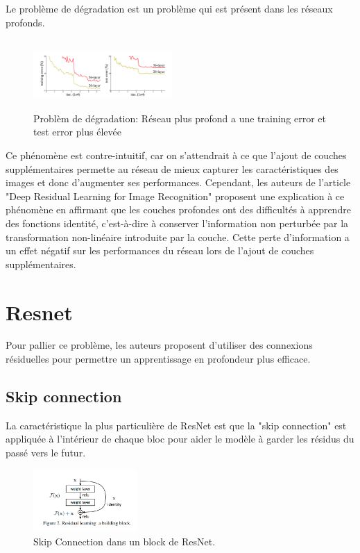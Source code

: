 \documentclass{article}
\begin{document}
Le problème de dégradation est un problème qui est présent dans les réseaux profonds.
\begin{figure}[t]
    \centering
    \includegraphics[width=200,height=100]{./img/degradation}
    \caption{Problèm de dégradation: Réseau plus profond a une training error et test error  plus élevée}
    \label{fig:}
\end{figure}
Ce phénomène est contre-intuitif, car on s'attendrait à ce que l'ajout de couches supplémentaires permette au réseau de mieux capturer les caractéristiques des images et donc d'augmenter ses performances.
Cependant, les auteurs de l'article "Deep Residual Learning for Image Recognition" proposent une explication à ce phénomène en affirmant que les couches profondes ont des difficultés à apprendre des fonctions identité, c'est-à-dire à conserver l'information non perturbée par la transformation non-linéaire introduite par la couche.
Cette perte d'information a un effet négatif sur les performances du réseau lors de l'ajout de couches supplémentaires.

\section{Resnet}

Pour pallier ce problème, les auteurs proposent d'utiliser des connexions résiduelles pour permettre un apprentissage en profondeur plus efficace.

\subsection{Skip connection}
La caractéristique la plus particulière de ResNet est que la "skip connection" est appliquée à l'intérieur de chaque bloc pour aider le modèle à garder les résidus du passé vers le futur.
\begin{figure}[t]
    \centering
    \includegraphics[width=150,height=90]{./img/skip}
    \caption{Skip Connection dans un block de ResNet.}
    \label{fig:}
\end{figure}
\end{document}
